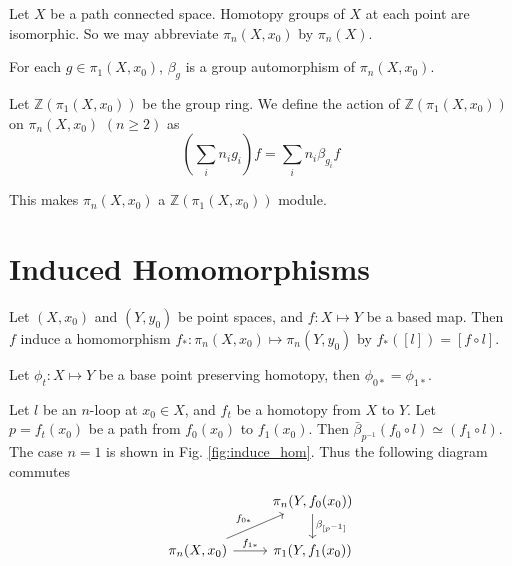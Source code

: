 \documentclass[12pt]{book}
\begin{document}
\begin{corollary}
	Let $X$ be a path connected space. Homotopy groups of $X$ at each point are isomorphic. So we may abbreviate $\pi_n(X,x_0)$ by $\pi_n(X)$.
\end{corollary}

\begin{corollary}
	For each $g\in \pi_1(X,x_0)$, $\beta_{g}$ is a group automorphism of $\pi_n(X,x_0)$.
\end{corollary}

\begin{definition}
	Let $\mathbb Z(\pi_1(X,x_0))$ be the group ring. We define the action of $\mathbb Z(\pi_1(X,x_0))$ on $\pi_n(X,x_0)$ $(n\geq2)$ as
	\begin{equation}
		(\sum_in_ig_i)f= \sum_in_i\beta_{g_i}f
	\end{equation}
	
	This makes $\pi_n(X,x_0)$ a $\mathbb Z(\pi_1(X,x_0))$ module.
\end{definition}

\section{Induced Homomorphisms}

\begin{definition}
	Let $(X,x_0)$ and $(Y,y_0)$ be point spaces, and $f:X\mapsto Y$ be a based map. Then $f$ induce a homomorphism $f_*:\pi_n(X,x_0)\mapsto\pi_n(Y,y_0)$ by $f_*([l])=[f\circ l]$.
\end{definition}

\begin{lemma}
	Let $\phi_t:X\mapsto Y$ be a base point preserving homotopy, then $\phi_{0*}=\phi_{1*}$.
\end{lemma}

\begin{lemma}
	Let $l$ be an $n$-loop at $x_0\in X$, and $f_t$ be a homotopy from $X$ to $Y$. Let $p=f_t(x_0)$ be a path from $f_0(x_0)$ to $f_1(x_0)$. Then $\bar \beta _{p^{-1}} (f_0\circ l)\simeq (f_1\circ l)$. The case $n=1$ is shown in Fig. \ref{fig:induce_hom}. Thus the following diagram commutes
	\[
	\begin{tikzcd}
		& \pi_n(Y,f_0(x_0))\arrow{d}{\beta_{[p^{-1}]}}
		\\
		\pi_n(X,x_0) \arrow{r}{f_{1*}} \arrow{ur}{f_{0*}}& \pi_1(Y,f_1(x_0))  
	\end{tikzcd}
	\]
\end{lemma}
\end{document}
